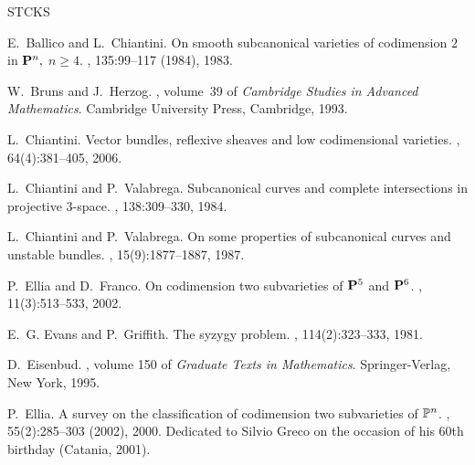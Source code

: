 \documentclass[11pt,a4paper]{amsart}
\theoremstyle{plain}
\theoremstyle{definition}
\begin{document}
\def\cfudot#1{\ifmmode\setbox7\hbox{$\accent"5E#1$}\else
  \setbox7\hbox{\accent"5E#1}\penalty 10000\relax\fi\raise 1\ht7
  \hbox{\raise.1ex\hbox to 1\wd7{\hss.\hss}}\penalty 10000 \hskip-1\wd7\penalty
  10000\box7}
\begin{thebibliography}{STCKS}

E.~Ballico and L.~Chiantini.
\newblock On smooth subcanonical varieties of codimension {$2$} in {${\bf
  P}^{n},$} {$n\geq 4$}.
, 135:99--117 (1984), 1983.

W.~Bruns and J.~Herzog.
, volume~39 of {\em Cambridge Studies in
  Advanced Mathematics}.
\newblock Cambridge University Press, Cambridge, 1993.

L.~Chiantini.
\newblock Vector bundles, reflexive sheaves and low codimensional varieties.
, 64(4):381--405, 2006.

L.~Chiantini and P.~Valabrega.
\newblock Subcanonical curves and complete intersections in projective
  {$3$}-space.
, 138:309--330, 1984.

L.~Chiantini and P.~Valabrega.
\newblock On some properties of subcanonical curves and unstable bundles.
, 15(9):1877--1887, 1987.

P.~Ellia and D.~Franco.
\newblock On codimension two subvarieties of {$\bold P^5$} and {$\bold P^6$}.
, 11(3):513--533, 2002.

E.~G. Evans and P.~Griffith.
\newblock The syzygy problem.
, 114(2):323--333, 1981.

D.~Eisenbud.
,
  volume 150 of {\em Graduate Texts in Mathematics}.
\newblock Springer-Verlag, New York, 1995.

P.~Ellia.
\newblock A survey on the classification of codimension two subvarieties of
  {$\Bbb P^n$}.
, 55(2):285--303 (2002), 2000.
\newblock Dedicated to Silvio Greco on the occasion of his 60th birthday
  (Catania, 2001).


\end{thebibliography}
\end{document}
